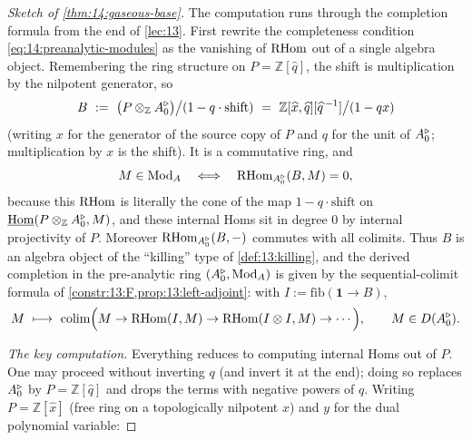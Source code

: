 \begin{proof}[Sketch of \cref{thm:14:gaseous-base}]
The computation runs through the completion formula from the end of
\cref{lec:13}. First rewrite the completeness condition
\eqref{eq:14:preanalytic-modules} as the vanishing of $\mathrm{RHom}$ out of a single
algebra object. Remembering the ring structure on $P=\mathbb{Z}[\widehat{q}]$, the
shift is multiplication by the nilpotent generator, so
\begin{equation*}
B\ :=\ \bigl(P\otimes_{\mathbb{Z}}\ur A_0\bigr)\big/(1-q\cdot\mathrm{shift})\ =\ \mathbb{Z}[\widehat{x},\widehat{q}][\widehat{q}^{\,-1}]\big/(1-qx)
\end{equation*}
(writing $x$ for the generator of the source copy of $P$ and $q$ for the unit of
$A^{\triangleright}_0$; multiplication by $x$ is the shift). It is a commutative ring, and
\begin{equation*}
M\in\operatorname{Mod}_A\quad\Longleftrightarrow\quad \mathrm{RHom}_{A^{\triangleright}_0}(B,M)=0,
\end{equation*}
because this $\mathrm{RHom}$ is literally the cone of the map
$1-q\cdot\mathrm{shift}$ on $\underline{\operatorname{Hom}}(P\otimes_{\mathbb{Z}}A^{\triangleright}_0,M)$, and these
internal Homs sit in degree $0$ by internal projectivity of $P$. Moreover
$\mathrm{RHom}_{A^{\triangleright}_0}(B,-)$ commutes with all colimits. Thus $B$ is an algebra object of
the ``killing'' type of \cref{def:13:killing}, and the derived completion in the
pre-analytic ring $(A^{\triangleright}_0,\operatorname{Mod}_A)$ is given by the sequential-colimit formula of
\cref{constr:13:F,prop:13:left-adjoint}: with $I:=\mathrm{fib}(\mathbf 1\to B)$,
\begin{equation}
\label{eq:14:completion-formula}
M\ \longmapsto\ \operatorname*{colim}\Bigl(M\to\RHom(I,M)\to\RHom(I\otimes I,M)\to\cdots\Bigr),\qquad M\in D(\ur A_0).
\end{equation}

\emph{The key computation.} Everything reduces to computing internal Homs out of
$P$. One may proceed without inverting $q$ (and invert it at the end); doing so
replaces $A^{\triangleright}_0$ by $P=\mathbb{Z}[\widehat q]$ and drops the terms with negative
powers of $q$. Writing $P=\mathbb{Z}[\widehat x]$ (free ring on a topologically
nilpotent $x$) and $y$ for the dual polynomial variable:


\end{proof}
